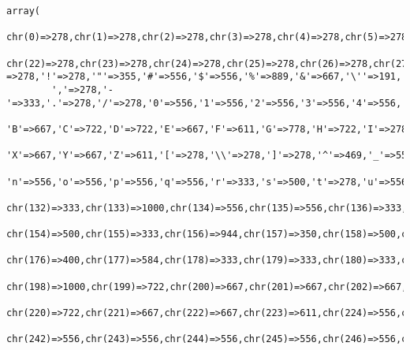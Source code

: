 \footnotesize\begin{verbatim}array(
        chr(0)=>278,chr(1)=>278,chr(2)=>278,chr(3)=>278,chr(4)=>278,chr(5)=>278,chr(6)=>278,chr(7)=>278,chr(8)=>278,chr(9)=>278,chr(10)=>278,chr(11)=>278,chr(12)=>278,chr(13)=>278,chr(14)=>278,chr(15)=>278,chr(16)=>278,chr(17)=>278,chr(18)=>278,chr(19)=>278,chr(20)=>278,chr(21)=>278,
        chr(22)=>278,chr(23)=>278,chr(24)=>278,chr(25)=>278,chr(26)=>278,chr(27)=>278,chr(28)=>278,chr(29)=>278,chr(30)=>278,chr(31)=>278, =>278,'!'=>278,'"'=>355,'#'=>556,'$'=>556,'%'=>889,'&'=>667,'\''=>191,'('=>333,')'=>333,'*'=>389,'+'=>584,
        ','=>278,'-'=>333,'.'=>278,'/'=>278,'0'=>556,'1'=>556,'2'=>556,'3'=>556,'4'=>556,'5'=>556,'6'=>556,'7'=>556,'8'=>556,'9'=>556,':'=>278,';'=>278,'<'=>584,'='=>584,'>'=>584,'?'=>556,'@'=>1015,'A'=>667,
        'B'=>667,'C'=>722,'D'=>722,'E'=>667,'F'=>611,'G'=>778,'H'=>722,'I'=>278,'J'=>500,'K'=>667,'L'=>556,'M'=>833,'N'=>722,'O'=>778,'P'=>667,'Q'=>778,'R'=>722,'S'=>667,'T'=>611,'U'=>722,'V'=>667,'W'=>944,
        'X'=>667,'Y'=>667,'Z'=>611,'['=>278,'\\'=>278,']'=>278,'^'=>469,'_'=>556,'`'=>333,'a'=>556,'b'=>556,'c'=>500,'d'=>556,'e'=>556,'f'=>278,'g'=>556,'h'=>556,'i'=>222,'j'=>222,'k'=>500,'l'=>222,'m'=>833,
        'n'=>556,'o'=>556,'p'=>556,'q'=>556,'r'=>333,'s'=>500,'t'=>278,'u'=>556,'v'=>500,'w'=>722,'x'=>500,'y'=>500,'z'=>500,'{'=>334,'|'=>260,'}'=>334,'~'=>584,chr(127)=>350,chr(128)=>556,chr(129)=>350,chr(130)=>222,chr(131)=>556,
        chr(132)=>333,chr(133)=>1000,chr(134)=>556,chr(135)=>556,chr(136)=>333,chr(137)=>1000,chr(138)=>667,chr(139)=>333,chr(140)=>1000,chr(141)=>350,chr(142)=>611,chr(143)=>350,chr(144)=>350,chr(145)=>222,chr(146)=>222,chr(147)=>333,chr(148)=>333,chr(149)=>350,chr(150)=>556,chr(151)=>1000,chr(152)=>333,chr(153)=>1000,
        chr(154)=>500,chr(155)=>333,chr(156)=>944,chr(157)=>350,chr(158)=>500,chr(159)=>667,chr(160)=>278,chr(161)=>333,chr(162)=>556,chr(163)=>556,chr(164)=>556,chr(165)=>556,chr(166)=>260,chr(167)=>556,chr(168)=>333,chr(169)=>737,chr(170)=>370,chr(171)=>556,chr(172)=>584,chr(173)=>333,chr(174)=>737,chr(175)=>333,
        chr(176)=>400,chr(177)=>584,chr(178)=>333,chr(179)=>333,chr(180)=>333,chr(181)=>556,chr(182)=>537,chr(183)=>278,chr(184)=>333,chr(185)=>333,chr(186)=>365,chr(187)=>556,chr(188)=>834,chr(189)=>834,chr(190)=>834,chr(191)=>611,chr(192)=>667,chr(193)=>667,chr(194)=>667,chr(195)=>667,chr(196)=>667,chr(197)=>667,
        chr(198)=>1000,chr(199)=>722,chr(200)=>667,chr(201)=>667,chr(202)=>667,chr(203)=>667,chr(204)=>278,chr(205)=>278,chr(206)=>278,chr(207)=>278,chr(208)=>722,chr(209)=>722,chr(210)=>778,chr(211)=>778,chr(212)=>778,chr(213)=>778,chr(214)=>778,chr(215)=>584,chr(216)=>778,chr(217)=>722,chr(218)=>722,chr(219)=>722,
        chr(220)=>722,chr(221)=>667,chr(222)=>667,chr(223)=>611,chr(224)=>556,chr(225)=>556,chr(226)=>556,chr(227)=>556,chr(228)=>556,chr(229)=>556,chr(230)=>889,chr(231)=>500,chr(232)=>556,chr(233)=>556,chr(234)=>556,chr(235)=>556,chr(236)=>278,chr(237)=>278,chr(238)=>278,chr(239)=>278,chr(240)=>556,chr(241)=>556,
        chr(242)=>556,chr(243)=>556,chr(244)=>556,chr(245)=>556,chr(246)=>556,chr(247)=>584,chr(248)=>611,chr(249)=>556,chr(250)=>556,chr(251)=>556,chr(252)=>556,chr(253)=>500,chr(254)=>556,chr(255)=>500)
\end{verbatim}\normalsize 
